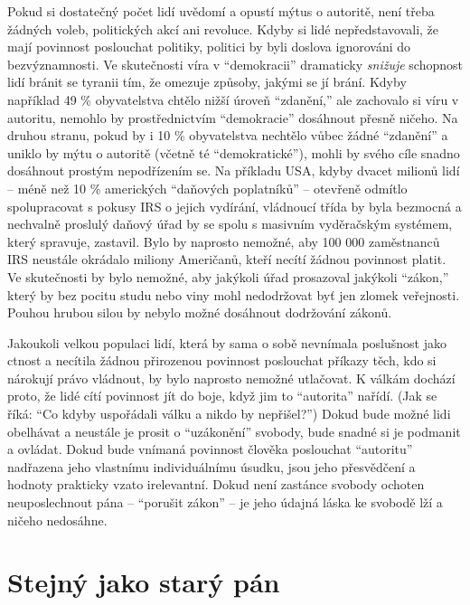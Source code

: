 \documentclass{book}
\begin{document}
Pokud si dostatečný počet lidí uvědomí a opustí mýtus o autoritě, není třeba žádných voleb, politických akcí ani revoluce. Kdyby si lidé nepředstavovali, že mají povinnost poslouchat politiky, politici by byli doslova ignorováni do bezvýznamnosti. Ve skutečnosti víra v \enquote{demokracii} dramaticky \emph{snižuje} schopnost lidí bránit se tyranii tím, že omezuje způsoby, jakými se jí brání. Kdyby například 49 \% obyvatelstva chtělo nižší úroveň \enquote{zdanění,} ale zachovalo si víru v autoritu, nemohlo by prostřednictvím \enquote{demokracie} dosáhnout přesně ničeho. Na druhou stranu, pokud by i 10 \% obyvatelstva nechtělo vůbec žádné \enquote{zdanění} a uniklo by mýtu o autoritě (včetně té \enquote{demokratické}), mohli by svého cíle snadno dosáhnout prostým nepodřízením se. Na příkladu USA, kdyby dvacet milionů lidí -- méně než 10 \% amerických \enquote{daňových poplatníků} -- otevřeně odmítlo spolupracovat s pokusy IRS o jejich vydírání, vládnoucí třída by byla bezmocná a nechvalně proslulý daňový úřad by se spolu s masivním vyděračským systémem, který spravuje, zastavil. Bylo by naprosto nemožné, aby 100 000 zaměstnanců IRS neustále okrádalo miliony Američanů, kteří necítí žádnou povinnost platit. Ve skutečnosti by bylo nemožné, aby jakýkoli úřad prosazoval jakýkoli \enquote{zákon,} který by bez pocitu studu nebo viny mohl nedodržovat byť jen zlomek veřejnosti. Pouhou hrubou silou by nebylo možné dosáhnout dodržování zákonů.

Jakoukoli velkou populaci lidí, která by sama o sobě nevnímala poslušnost jako ctnost a necítila žádnou přirozenou povinnost poslouchat příkazy těch, kdo si nárokují právo vládnout, by bylo naprosto nemožné utlačovat. K válkám dochází proto, že lidé cítí povinnost jít do boje, když jim to \enquote{autorita} nařídí. (Jak se říká: \enquote{Co kdyby uspořádali válku a nikdo by nepřišel?}) Dokud bude možné lidi obelhávat a neustále je prosit o \enquote{uzákonění} svobody, bude snadné si je podmanit a ovládat. Dokud bude vnímaná povinnost člověka poslouchat \enquote{autoritu} nadřazena jeho vlastnímu individuálnímu úsudku, jsou jeho přesvědčení a hodnoty prakticky vzato irelevantní. Dokud není zastánce svobody ochoten neuposlechnout pána -- \enquote{porušit zákon} -- je jeho údajná láska ke svobodě lží a ničeho nedosáhne.

\section{Stejný jako starý pán}
\end{document}
